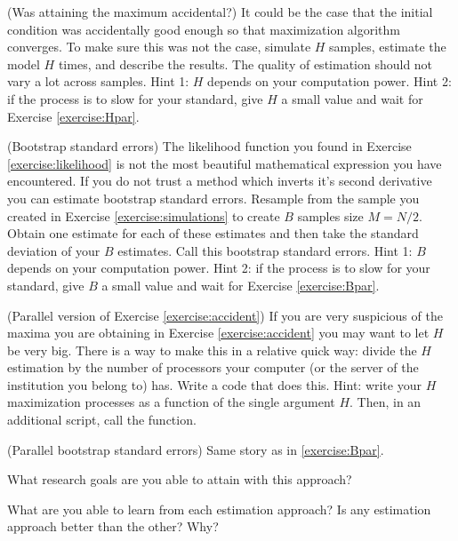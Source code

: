 \begin{exercise} (Was attaining the maximum accidental?) \label{exercise:accident}
It could be the case that the initial condition was accidentally good enough so that maximization algorithm converges. To make sure this was not the case, simulate $H$ samples, estimate the model $H$ times, and describe the results. The quality of estimation should not vary a lot across samples. Hint 1: $H$ depends on your computation power. Hint 2: if the process is to slow for your standard, give $H$ a small value and wait for Exercise \ref{exercise:Hpar}.
\end{exercise}

\begin{exercise} (Bootstrap standard errors) \label{exercise:bootstrap}
The likelihood function you found in Exercise \ref{exercise:likelihood} is not the most beautiful mathematical expression you have encountered. If you do not trust a method which inverts it's second derivative you can estimate bootstrap standard errors. Resample from the sample you created in Exercise \ref{exercise:simulations} to create $B$ samples size $M = N/2$. Obtain one estimate for each of these estimates and then take the standard deviation of your $B$ estimates. Call this bootstrap standard errors. Hint 1: $B$ depends on your computation power. Hint 2: if the process is to slow for your standard, give $B$ a small value and wait for Exercise \ref{exercise:Bpar}.
\end{exercise}

\begin{exercise} (Parallel version of Exercise \ref{exercise:accident}) \label{exercise:Hpar}
If you are very suspicious of the maxima you are obtaining in Exercise \ref{exercise:accident} you may want to let $H$ be very big. There is a way to make this in a relative quick way: divide the $H$ estimation by the number of processors your computer (or the server of the institution you belong to) has. Write a code that does this. Hint: write your $H$ maximization processes as a function of the single argument $H$. Then, in an additional script, call the function.
\end{exercise}

\begin{exercise} (Parallel bootstrap standard errors) \label{exercise:Bpar}
Same story as in \ref{exercise:Bpar}.
\end{exercise}

\begin{exercise} \label{exercise:psapproach}
What research goals are you able to attain with this approach?
\end{exercise}

\begin{exercise}
What are you able to learn from each estimation approach? Is any estimation approach better than the other? Why?
\end{exercise}